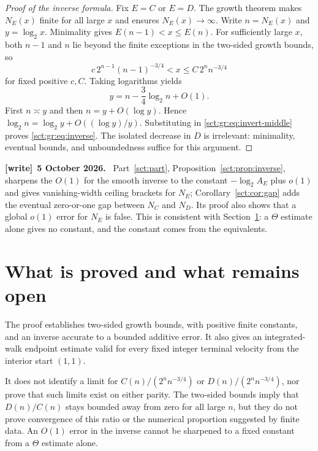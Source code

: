 \documentclass[11pt,letterpaper]{article}
\theoremstyle{definition}\newtheorem{remark}[theorem]{Remark}
\newenvironment{writenote}[1][]{\par\smallskip\begingroup\small
 \noindent\textbf{[write]}\if\relax\detokenize{#1}\relax\else~\textbf{#1.}\fi\ }%
 {\par\endgroup\smallskip}
\begin{document}
\pagebreak[3]
\begin{proof}[Proof of the inverse formula]
Fix $E=C$ or $E=D$. The growth theorem makes $N_E(x)$ finite for all large
$x$ and ensures $N_E(x)\to\infty$. Write $n=N_E(x)$ and $y=\log_2x$.
Minimality gives $E(n-1)<x\le E(n)$. For sufficiently large $x$, both
$n-1$ and $n$ lie beyond the finite exceptions in the two-sided growth bounds,
so
\[
 c\,2^{n-1}(n-1)^{-3/4}<x
 \le C\,2^n n^{-3/4}
\]
for fixed positive $c,C$. Taking logarithms yields
\begin{equation}\label{sct:gr:eq:invert-middle}
 y=n-\frac34\log_2n+O(1).
\end{equation}
First $n\asymp y$ and then $n=y+O(\log y)$. Hence
$\log_2n=\log_2y+O((\log y)/y)$. Substituting in
\eqref{sct:gr:eq:invert-middle} proves \eqref{sct:gr:eq:inverse}.
The isolated decrease in $D$ is irrelevant: minimality, eventual bounds, and
unboundedness suffice for this argument.
\end{proof}
\begin{writenote}[5 October 2026]
Part~\ref{sct:part}, Proposition~\ref{sct:prop:inverse}, sharpens the $O(1)$ for the smooth inverse to the constant $-\log_2A_E$ plus $o(1)$ and gives vanishing-width ceiling brackets for $N_E$; Corollary~\ref{sct:cor:gap} adds the eventual zero-or-one gap between $N_C$ and $N_D$. Its proof also shows that a global $o(1)$ error for $N_E$ is false. This is consistent with Section~\ref{sct:gr:sec:scope}: a $\Theta$ estimate alone gives no constant, and the constant comes from the equivalents.
\end{writenote}

\section{What is proved and what remains open}\label{sct:gr:sec:scope}

The proof establishes two-sided growth bounds, with positive finite constants,
and an inverse accurate to a bounded additive error. It also gives an
integrated-walk endpoint estimate valid for every fixed integer terminal
velocity from the interior start $(1,1)$.

It does not identify a limit for $C(n)/(2^nn^{-3/4})$ or
$D(n)/(2^nn^{-3/4})$, nor prove that such limits exist on either parity.
The two-sided bounds imply that $D(n)/C(n)$ stays bounded away from zero
for all large $n$, but they do not prove convergence of this ratio or the
numerical proportion suggested by finite data. An $O(1)$ error in the inverse
cannot be sharpened to a fixed constant from a $\Theta$ estimate alone.
\end{document}

